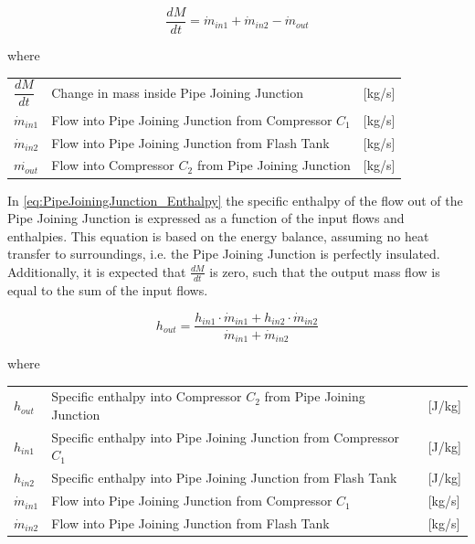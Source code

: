 \begin{equation} \label{eq:PipeJoiningJunction_ChangeOfMass}
	\frac{dM}{dt} = \dot{m}_{in1} + \dot{m}_{in2} - \dot{m}_{out}
\end{equation}


where

\begin{center}
	\begin{tabular}{l p{8cm} l}
		$\dfrac{dM}{dt}$ & Change in mass inside Pipe Joining Junction		 	& [\si{kg}/\si{s}]\\
		$\dot{m}_{in1}$ & Flow into Pipe Joining Junction from Compressor $ C_1 $ 		& [\si{kg}/\si{s}]\\
		$\dot{m}_{in2}$ & Flow into Pipe Joining Junction from Flash Tank 				& [\si{kg}/\si{s}]\\
		$\dot{m_{out}}$ & Flow into Compressor $ C_2 $ from Pipe Joining Junction		& [\si{kg}/\si{s}]\\
	\end{tabular}
\end{center}

In \cref{eq:PipeJoiningJunction_Enthalpy} the specific enthalpy of the flow out of the Pipe Joining Junction is expressed as a function of the input flows and enthalpies. This equation is based on the energy balance, assuming no heat transfer to surroundings, i.e. the Pipe Joining Junction is perfectly insulated. Additionally, it is expected that $\frac{dM}{dt}$ is zero, such that the output mass flow is equal to the sum of the input flows. 

\begin{equation} \label{eq:PipeJoiningJunction_Enthalpy}
	h_{out} = \frac{h_{in1} \cdot \dot{m}_{in1} + h_{in2} \cdot \dot{m}_{in2}}{ \dot{m}_{in1} + \dot{m}_{in2} }
\end{equation}

where

\begin{center}
	\begin{tabular}{l p{10cm} l}
		$h_{out}$ 			& Specific enthalpy into Compressor $ C_2 $ from Pipe Joining Junction 			& [\si{J}/\si{kg}]\\
		$h_{in1}$ 			& Specific enthalpy into Pipe Joining Junction from Compressor $ C_1 $  					& [\si{J}/\si{kg}]\\
		$h_{in2}$ 			& Specific enthalpy into Pipe Joining Junction from Flash Tank   				& [\si{J}/\si{kg}]\\
		$\dot{m}_{in1}$ 	& Flow into Pipe Joining Junction from Compressor $ C_1 $ 		& [\si{kg}/\si{s}]\\
		$\dot{m}_{in2}$ 	& Flow into Pipe Joining Junction from Flash Tank 				& [\si{kg}/\si{s}]\\
	\end{tabular}
\end{center}



